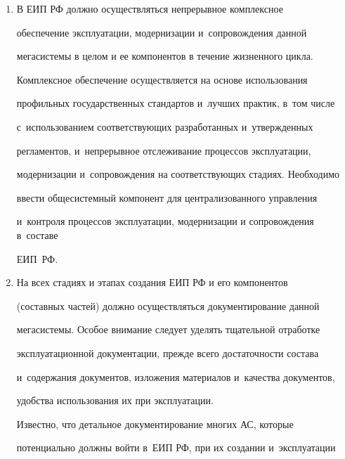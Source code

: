 \begin{enumerate}[1.]
преду\-смат\-ри\-вает использование комплекса взаимоувязанных мер и~решений

современного уровня. В~том числе могут использоваться для необходимых

функ\-ци\-о\-наль\-но-ори\-ен\-ти\-ро\-ван\-ных ЗИР различные контуры:

открытый (О-кон\-тур); конфиденциальный (К-кон\-тур), секретный

     (С-кон\-тур).

     \item В ЕИП РФ должно осуществляться непрерывное комплексное

обеспечение эксплуатации, модернизации и~сопровождения данной

мегасистемы в целом и ее компонентов в течение жизненного цикла.



     Комплексное обеспечение осуществляется на основе использования

профильных государственных стандартов и~лучших практик, в~том числе

с~использованием соответствующих разработанных и~утвержденных

регламентов, и~непрерывное отслеживание процессов эксплуатации,

модернизации и~сопровождения на соответствующих стадиях. Необходимо

ввести обще\-сис\-тем\-ный компонент для централизованного управления

и~контроля процессов эксплуатации, модернизации и сопровождения в~составе

ЕИП~РФ.

     \item На всех стадиях и этапах создания ЕИП РФ и его компонентов

(составных частей) должно осуществляться документирование данной

мегасистемы. Особое внимание следует уделять тщательной отработке

эксплуатационной документации, прежде всего достаточности состава

и~содержания документов, изложения материалов и~качества документов,

удобства использования их при эксплуатации.



     Известно, что детальное документирование многих АС, которые

потенциально должны войти в~ЕИП РФ, при их создании и~эксплуатации


\end{enumerate}
